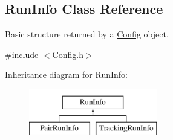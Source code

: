 \hypertarget{classRunInfo}{
\subsection{RunInfo Class Reference}
\label{classRunInfo}
}


Basic structure returned by a \hyperlink{classConfig}{Config} object.  




{\ttfamily \#include $<$Config.h$>$}

Inheritance diagram for RunInfo:\begin{figure}[H]
\begin{center}
\leavevmode
\includegraphics[height=2.000000cm]{classRunInfo}
\end{center}
\end{figure}
